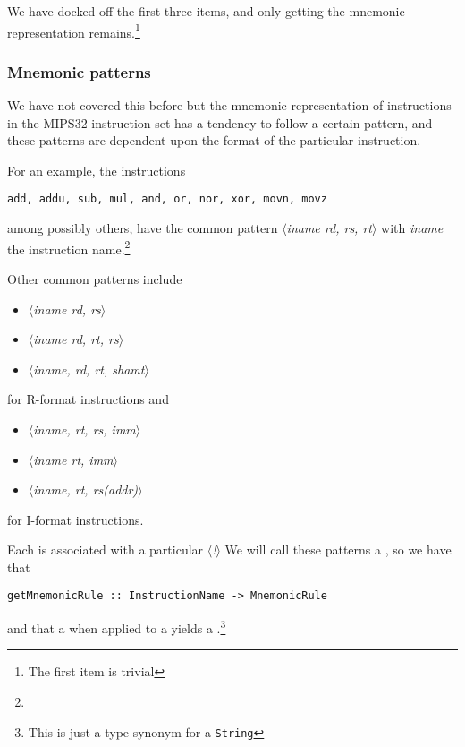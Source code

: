 We have docked off the first three items, and only getting the
mnemonic representation remains.\footnote{The first item is trivial}

\subsubsection{Mnemonic patterns}

We have not covered this before but the mnemonic representation of
instructions in the MIPS32 instruction set has a tendency to follow
a certain pattern, and these patterns are dependent upon the format of
the particular instruction.

For an example, the instructions

\begin{verbatim}
add, addu, sub, mul, and, or, nor, xor, movn, movz
\end{verbatim}

among possibly others, have the common pattern \emph{$\langle$iname
rd, rs, rt$\rangle$} with
\emph{iname} the instruction name.\footnote{\inamem}

\newcommand{\pattern}[1]{\emph{$\langle$#1$\rangle$}}

Other common patterns include 

\begin{itemize}
\item \pattern{iname rd, rs}
\item \pattern{iname rd, rt, rs}
\item \pattern{iname, rd, rt, shamt}
\end{itemize}

for R-format instructions and

\begin{itemize}
\item \pattern{iname, rt, rs, imm}
\item \pattern{iname rt, imm}
\item \pattern{iname, rt, rs(addr)}
\end{itemize}

for I-format instructions.

Each \inamem is associated with a particular \pattern! We will call
these patterns a , so we have that

\begin{verbatim}
getMnemonicRule :: InstructionName -> MnemonicRule
\end{verbatim}

and that a  when applied to a \decomposedm
yields a .\footnote{This is just a type synonym for a \texttt{String}}

